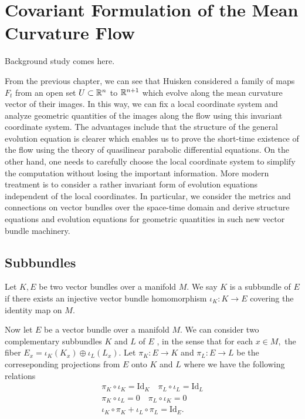 %

\chapter{Covariant Formulation of the Mean Curvature Flow}

{
Background study comes here.
}

From the previous chapter, we can see that Huisken considered a family of maps $F_t$ from an open set $U \subset \mathbb{R}^n$ to $\mathbb{R}^{n+1}$ which evolve along the mean curvature vector of their images. In this way, we can fix a local coordinate system and analyze geometric quantities of the images along the flow using this invariant coordinate system. The advantages include that the structure of the general evolution equation is clearer which enables us to prove the short-time existence of the flow using the theory of quasilinear parabolic differential equations. On the other hand, one needs to carefully choose the local coordinate system to simplify the computation without losing the important information. More modern treatment is to consider a rather invariant form of evolution equations independent of the local coordinates. In particular, we consider the metrics and connections on vector bundles over the space-time domain and derive structure equations and evolution equations for geometric quantities in such new vector bundle machinery.

\section{Subbundles}

\begin{definition}
    Let $K, E$ be two vector bundles over a manifold $M$. We say $K$ is a subbundle of $E$ if there exists an injective vector bundle homomorphism $\iota_K : K \to E$ covering the identity map on $M$.
\end{definition}

Now let $E$ be a vector bundle over a manifold $M$. We can consider two complementary subbundles $K$ and $L$ of $E$ , in the sense that for each $x \in M,$ the fiber $E_x=\iota_K(K_x) \oplus \iota_L(L_x)$. Let $\pi _K : E \to K$ and $\pi _L : E \to L$ be the correseponding projections from $E$ onto $K$ and $L$ where we have the following relations
\begin{gather*}
    \pi _K \circ \iota _K= \mathrm{Id}_K \quad \pi _L \circ \iota _L=\mathrm{Id}_L\\
    \pi _K \circ \iota _L=0 \quad \pi _L \circ \iota _K=0\\
    \iota _K \circ \pi _K + \iota _L \circ \pi _L = \mathrm{Id}_E.
\end{gather*}

